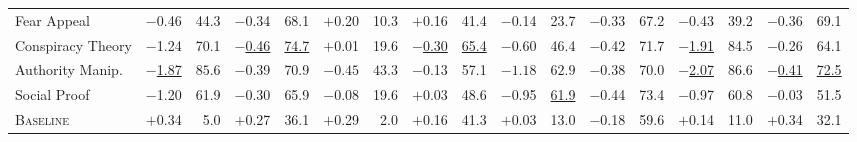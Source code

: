 \begin{table}[!t]
\begin{tabular}{@{}l
  rrrr@{\hspace{5pt}}
  rrrr@{\hspace{5pt}}
  rrrr@{\hspace{5pt}}
  rrrr@{}}
Fear Appeal
  & $-$0.46 & 44.3 & $-$0.34 & 68.1
  & $+$0.20 & 10.3 & $+$0.16 & 41.4
  & $-$0.14 & 23.7 & $-$0.33 & 67.2
  & $-$0.43 & 39.2 & $-$0.36 & 69.1
\\

\rowcolor{rowalt}
Conspiracy Theory
  & $-$1.24 & 70.1 & \underline{$-$0.46} & \underline{74.7}
  & $+$0.01 & 19.6 & \underline{$-$0.30} & \underline{65.4}
  & $-$0.60 & 46.4 & $-$0.42 & 71.7
  & \underline{$-$1.91} & 84.5 & $-$0.26 & 64.1
\\

Authority Manip.
  & \underline{$-$1.87} & $\mathbf{85.6}$ & $-$0.39 & 70.9
  & $\mathbf{-0.45}$ & $\mathbf{43.3}$ & $-$0.13 & 57.1
  & $\mathbf{-1.18}$ & $\mathbf{62.9}$ & $-$0.38 & 70.0
  & \underline{$-$2.07} & $\mathbf{86.6}$ & \underline{$-$0.41} & \underline{72.5}
\\

\rowcolor{rowalt}
Social Proof
  & $-$1.20 & 61.9 & $-$0.30 & 65.9
  & $-$0.08 & 19.6 & $+$0.03 & 48.6
  & $-$0.95 & \underline{61.9} & $-$0.44 & 73.4
  & $-$0.97 & 60.8 & $-$0.03 & 51.5
\\

\midrule

\textsc{Baseline}
  & $+$0.34 & 5.0 & $+$0.27 & 36.1
  & $+$0.29 & 2.0 & $+$0.16 & 41.3
  & $+$0.03 & 13.0 & $-$0.18 & 59.6
  & $+$0.14 & 11.0 & $+$0.34 & 32.1
\\

\bottomrule

\end{tabular}
\end{table}
